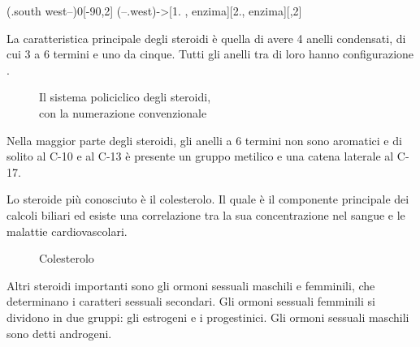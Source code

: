 {\footnotesize
	\begin{reaction}
	\arrow(.south west--){0}[-90,2]
	\phantom{O}
	\arrow(--.west){->[1. , enzima][2.\!\!\!\!\!\!, enzima]}[,2]
\end{reaction}
}
La caratteristica principale degli steroidi è quella di avere 4 anelli condensati, di cui 3 a 6 termini e uno da cinque. Tutti gli anelli tra di loro hanno configurazione \trans.

\begin{figure}[H]
	\centering

	\caption*{\color{blue}Il sistema policiclico degli steroidi,\\con la numerazione convenzionale}
\end{figure}
Nella maggior parte degli steroidi, gli anelli a 6 termini non sono aromatici e di solito al C-10 e al C-13 è presente un gruppo metilico e una catena laterale al C-17.

Lo steroide più conosciuto è il colesterolo. Il quale è il componente principale dei calcoli biliari ed esiste una correlazione tra la sua concentrazione nel sangue e le malattie cardiovascolari.

\begin{figure}[H]
	\centering
\caption*{Colesterolo}
\end{figure}

Altri steroidi importanti sono gli ormoni sessuali maschili e femminili, che determinano i caratteri sessuali secondari. Gli ormoni sessuali femminili si dividono in due gruppi: gli estrogeni e i progestinici. Gli ormoni sessuali maschili sono detti androgeni.
